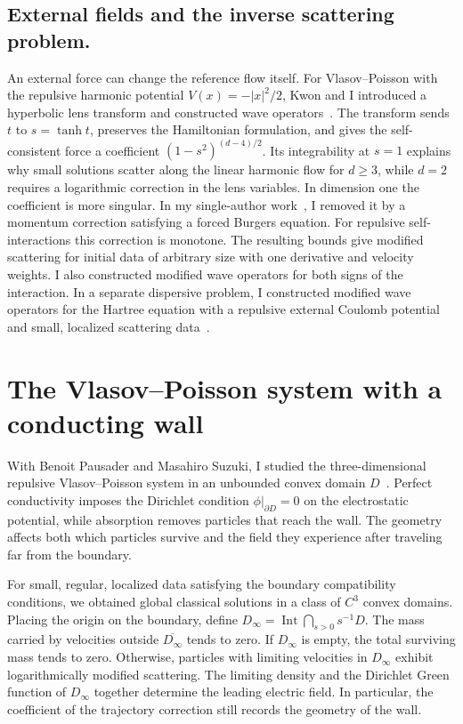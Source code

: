 \documentclass[reqno,10pt,letterpaper]{amsart}
\numberwithin{equation}{section}
\begin{document}
\subsection{External fields and the inverse scattering problem.}
An external force can change the reference flow itself. For Vlasov--Poisson with the repulsive harmonic potential $V(x)=-|x|^2/2$, Kwon and I introduced a hyperbolic lens transform and constructed wave operators~\cite{HK26}. The transform sends $t$ to $s=\tanh t$, preserves the Hamiltonian formulation, and gives the self-consistent force a coefficient $(1-s^2)^{(d-4)/2}$. Its integrability at $s=1$ explains why small solutions scatter along the linear harmonic flow for $d\geq3$, while $d=2$ requires a logarithmic correction in the lens variables. In dimension one the coefficient is more singular. In my single-author work~\cite{H26}, I removed it by a momentum correction satisfying a forced Burgers equation. For repulsive self-interactions this correction is monotone. The resulting bounds give modified scattering for initial data of arbitrary size with one derivative and velocity weights. I also constructed modified wave operators for both signs of the interaction. In a separate dispersive problem, I constructed modified wave operators for the Hartree equation with a repulsive external Coulomb potential and small, localized scattering data~\cite{H24}.

\section{The Vlasov--Poisson system with a conducting wall}

With Benoit Pausader and Masahiro Suzuki, I studied the three-dimensional repulsive Vlasov--Poisson system in an unbounded convex domain $D$~\cite{HPS24}. Perfect conductivity imposes the Dirichlet condition $\phi|_{\partial D}=0$ on the electrostatic potential, while absorption removes particles that reach the wall. The geometry affects both which particles survive and the field they experience after traveling far from the boundary.

For small, regular, localized data satisfying the boundary compatibility conditions, we obtained global classical solutions in a class of $C^3$ convex domains. Placing the origin on the boundary, define $D_\infty=\operatorname{Int}\bigcap_{s>0}s^{-1}D$. The mass carried by velocities outside $\overline{D_\infty}$ tends to zero. If $D_\infty$ is empty, the total surviving mass tends to zero. Otherwise, particles with limiting velocities in $D_\infty$ exhibit logarithmically modified scattering. The limiting density and the Dirichlet Green function of $D_\infty$ together determine the leading electric field. In particular, the coefficient of the trajectory correction still records the geometry of the wall.
\end{document}
